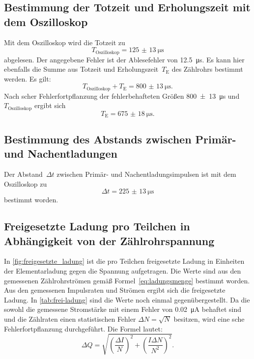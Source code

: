 \subsection{Bestimmung der Totzeit und Erholungszeit mit dem Oszilloskop}

Mit dem Oszilloskop wird die Totzeit zu
\begin{equation}
  T_\text{Oszilloskop} = \SI{125(13)}{\micro\second}
\end{equation}
abgelesen. Der angegebene Fehler ist der Ablesefehler von
\SI{12.5}{\micro\second}. Es kann hier ebenfalls die Summe aus Totzeit
und Erholungszeit~$T_\text{E}$ des Zählrohrs bestimmt werden. Es gilt:
\begin{equation}
  T_\text{Oszilloskop} + T_\text{E} = \SI{800(13)}{\micro\second}.
\end{equation}
Nach scher Fehlerfortpflanzung der fehlerbehafteten Größen
\SI{800(13)}{\micro\second} und $T_\text{Oszilloskop}$ ergibt sich
\begin{equation}
    T_\text{E} = \SI{675(18)}{\micro\second}.
\end{equation}

\subsection{Bestimmung des Abstands zwischen Primär- und
  Nachentladungen}

Der Abstand~$\Delta t$ zwischen Primär- und Nachentladungsimpulsen ist mit dem
Oszilloskop zu
%
\begin{equation}
  \Delta t = \SI{225(13)}{\micro\second}
\end{equation}
%
bestimmt worden.

\subsection{Freigesetzte Ladung pro Teilchen in Abhängigkeit von der
  Zählrohrspannung}

In \cref{fig:freigesetzte_ladung} ist die pro Teilchen freigesetzte
Ladung in Einheiten der Elementarladung gegen die Spannung aufgetragen.
Die Werte sind aus den gemessenen Zählrohrströmen gemäß
Formel~\eqref{eq:ladungsmenge} bestimmt worden. Aus den gemessenen
Impulsraten und Strömen ergibt sich die freigesetzte Ladung. In
\cref{tab:frei-ladung} sind die Werte noch einmal gegenübergestellt.  Da
die sowohl die gemessene Stromstärke mit einem Fehler von
\SI{0.02}{\micro\ampere} behaftet sind und die Zählraten einen
statistischen Fehler $\Delta N = \sqrt{N}$ besitzen, wird eine
sche Fehlerfortpflanzung durchgeführt.  Die Formel lautet:
\begin{equation}
  \label{eq:gauss-ladungsmenge}
  \Delta Q = \sqrt{ \left( \frac{\Delta I}{N}\right)^2 + \left(\frac{I
        \Delta N}{N^2}\right)^2}.
\end{equation}

